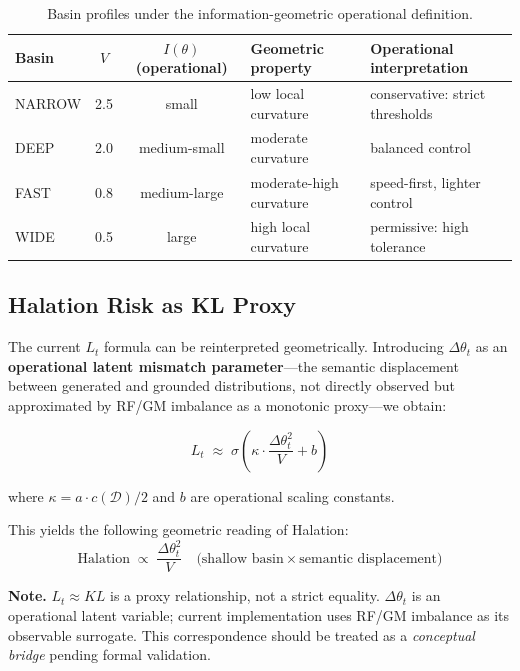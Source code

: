 \documentclass[11pt,a4paper]{article}
\begin{document}
\begin{table}[h]
\centering
\caption{Basin profiles under the information-geometric operational definition.}
\label{tab:basin_geo}
\begin{tabular}{@{}lccll@{}}
\toprule
Basin & $V$ & $I(\theta)$ (operational) & Geometric property & Operational interpretation \\
\midrule
NARROW & 2.5 & small & low local curvature & conservative: strict thresholds \\
DEEP   & 2.0 & medium-small & moderate curvature & balanced control \\
FAST   & 0.8 & medium-large & moderate-high curvature & speed-first, lighter control \\
WIDE   & 0.5 & large & high local curvature & permissive: high tolerance \\
\bottomrule
\end{tabular}
\end{table}

\subsection{Halation Risk as KL Proxy}

The current $L_t$ formula can be reinterpreted geometrically.
Introducing $\Delta\theta_t$ as an \textbf{operational latent mismatch parameter}---the
semantic displacement between generated and grounded distributions,
not directly observed but approximated by RF/GM imbalance as a monotonic proxy---we obtain:

\begin{equation}
L_t \;\approx\; \sigma\!\left(\kappa \cdot \frac{\Delta\theta_t^2}{V} + b\right)
\label{eq:lt_geo}
\end{equation}

where $\kappa = a \cdot c(\mathcal{D})/2$ and $b$ are operational scaling constants.

This yields the following geometric reading of Halation:
\begin{equation}
\text{Halation} \;\propto\; \frac{\Delta\theta_t^2}{V}
\quad\text{(shallow basin} \times \text{semantic displacement)}
\end{equation}

\textbf{Note.}
$L_t \approx KL$ is a proxy relationship, not a strict equality.
$\Delta\theta_t$ is an operational latent variable; current implementation
uses RF/GM imbalance as its observable surrogate.
This correspondence should be treated as a \textit{conceptual bridge} pending formal validation.
\end{document}
